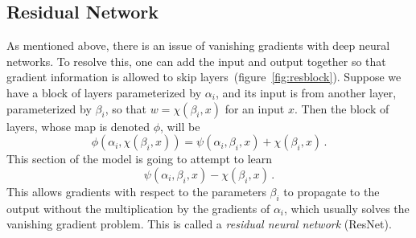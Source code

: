 \subsection{Residual Network}
As mentioned above, there is an issue of vanishing gradients with deep neural networks. To resolve this, one can add the input and output together so that gradient information is allowed to skip layers~\cite{he_deep_2015}(figure~\ref{fig:resblock}). Suppose we have a block of layers parameterized by $\alpha_i$, and its input is from another layer, parameterized by $\beta_i$, so that $w=\chi(\beta_i,x)$ for an input $x$. Then the block of layers, whose map is denoted $\phi$, will be
\begin{equation}
	\phi(\alpha_i,\chi(\beta_i,x)) = \psi(\alpha_i,\beta_i,x)+\chi(\beta_i,x)\,.
\end{equation}
This section of the model is going to attempt to learn
\begin{equation}
	\psi(\alpha_i,\beta_i,x)-\chi(\beta_i,x)\,.
\end{equation}
This allows gradients with respect to the parameters $\beta_i$ to propagate to the output without the multiplication by the gradients of $\alpha_i$, which usually solves the vanishing gradient problem. This is called a \textit{residual neural network} (ResNet).
